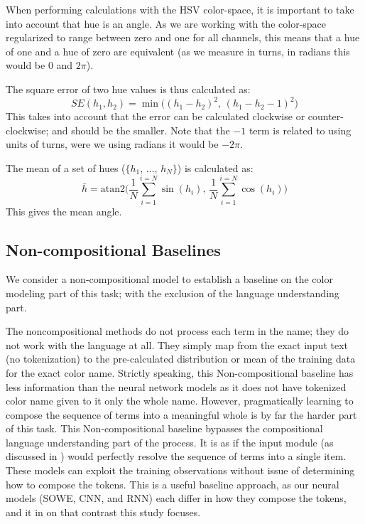 \documentclass[]{clv3}
\newcommand{\empmodel}{Non-compositional baseline}
\begin{document}
When performing calculations with the HSV color-space, it is important to take into account that hue is an angle.
As we are working with the color-space regularized to range between zero and one for all channels,
this means that a hue of one and a hue of zero are equivalent (as we measure in turns, in radians this would be $0$ and $2\pi$).

The square error of two hue values is thus calculated as:
\begin{equation}
SE(h_1, h_2) = \min \big( \left(h_1 - h_2 \right)^2, \, \left(h_1 - h_2 -1 \right)^2  \big)
\end{equation}
This takes into account that the error can be calculated clockwise or counter-clockwise; and should be the smaller.
Note that the $-1$ term is related to using units of turns, were we using radians it would be $-2\pi$.


The mean of a set of hues ($\lbrace h_1,\,\ldots,\,h_N \rbrace$) is calculated as:
\begin{equation}
\bar h = \mathrm{atan2} \Bigg(%
	\frac{1}{N} \sum_{i=1}^{i=N} \sin (h_i), \,  %
	\frac{1}{N} \sum_{i=1}^{i=N} \cos (h_i)%
\Bigg)%
\end{equation}
This gives the mean angle.



\subsection{Non-compositional Baselines}
We consider a non-compositional model to establish a baseline on the color modeling part of this task; with the exclusion of the language understanding part.

The noncompositional methods do not process each term in the name; they do not work with the language at all.
They simply map from the exact input text (no tokenization) to the pre-calculated distribution or mean of the training data for the exact color name.
%
Strictly speaking, this \empmodel{} has less information than the neural network models
as it does not have tokenized color name given to it only the whole name.
However, pragmatically learning to compose the sequence of terms into a meaningful whole is by far the harder part of this task.
%
This \empmodel{} bypasses the compositional language understanding part of the process.
It is as if the input module (as discussed in ) would perfectly resolve the sequence of terms into a single item.
%
These models can exploit the training observations without issue of determining how to compose the tokens.
This is a useful baseline approach, as our neural models (SOWE, CNN, and RNN)
each differ in how they compose the tokens, and it in on that contrast this study focuses.
\end{document}
